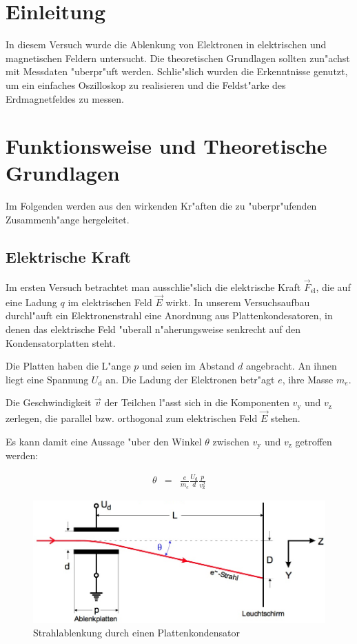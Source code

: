 \section{Einleitung}
	In diesem Versuch wurde die Ablenkung von Elektronen in elektrischen und magnetischen Feldern untersucht.
	Die theoretischen Grundlagen sollten zun"achst mit Messdaten "uber\-pr"uft werden.
	Schlie"slich wurden die Erkenntnisse genutzt, um ein einfaches Oszilloskop zu realisieren und die Feldst"arke des Erdmagnetfeldes zu messen.

\section{Funktionsweise und Theoretische Grundlagen}
	Im Folgenden werden aus den wirkenden Kr"aften die zu "uberpr"ufenden Zusammenh"ange hergeleitet.

	\subsection{Elektrische Kraft}
		Im ersten Versuch betrachtet man ausschlie"slich die elektrische Kraft $\vec{F}_\mathrm{el}$, die auf eine Ladung $q$ im elektrischen Feld $\vec{E}$ wirkt.
		In unserem Versuchsaufbau durchl"auft ein Elektronenstrahl eine Anordnung aus Plattenkondesatoren,
		in denen das elektrische Feld "uberall n"aherungsweise senkrecht auf den Kondensatorplatten steht.

		Die Platten haben die L"ange $p$ und seien im Abstand $d$ angebracht. An ihnen liegt eine Spannung $U_\mathrm{d}$ an.
		Die Ladung der Elektronen betr"agt $e$, ihre Masse $m_e$.

		Die Geschwindigkeit $\vec{v}$ der Teilchen l"asst sich in die Komponenten $v_\mathrm{y}$ und $v_\mathrm{z}$ zerlegen,
		die parallel bzw. orthogonal zum elektrischen Feld $\vec{E}$ stehen.

		Es kann damit eine Aussage "uber den Winkel $\theta$ zwischen $v_\mathrm{y}$ und $v_\mathrm{z}$ getroffen werden:

		\begin{eqnarray}
			\theta & = & \frac{e}{m_e} \frac{U_\mathrm{d}}{d} \frac{p}{v_\mathrm{z}^2}
			\label{theta}
		\end{eqnarray}

		\begin{figure}[h]
			\centering
			\includegraphics[width = 14cm]{img/ablenkung.png}
			\caption{Strahlablenkung durch einen Plattenkondensator}
			\label{ablenkung}
		\end{figure}

